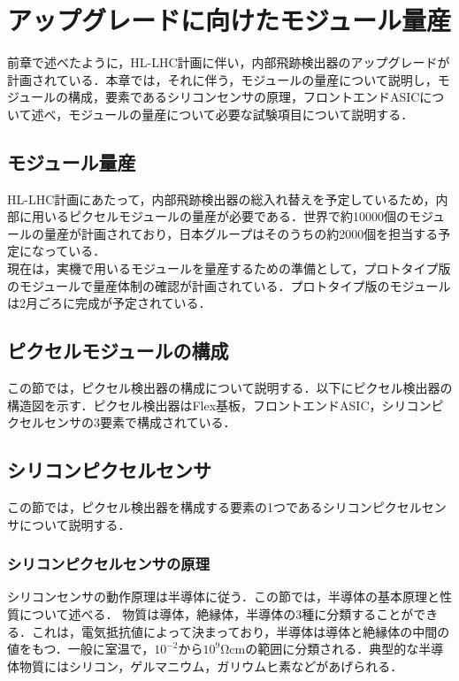 \chapter{アップグレードに向けたモジュール量産}
前章で述べたように，HL-LHC計画に伴い，内部飛跡検出器のアップグレードが計画されている．本章では，それに伴う，モジュールの量産について説明し，モジュールの構成，要素であるシリコンセンサの原理，フロントエンドASICについて述べ，モジュールの量産について必要な試験項目について説明する．

\section{モジュール量産}
HL-LHC計画にあたって，内部飛跡検出器の総入れ替えを予定しているため，内部に用いるピクセルモジュールの量産が必要である．世界で約10000個のモジュールの量産が計画されており，日本グループはそのうちの約2000個を担当する予定になっている．\\
現在は，実機で用いるモジュールを量産するための準備として，プロトタイプ版のモジュールで量産体制の確認が計画されている．プロトタイプ版のモジュールは2月ごろに完成が予定されている．

\section{ピクセルモジュールの構成}
この節では，ピクセル検出器の構成について説明する．以下にピクセル検出器の構造図を示す．ピクセル検出器はFlex基板，フロントエンドASIC，シリコンピクセルセンサの3要素で構成されている．


\section{シリコンピクセルセンサ}
この節では，ピクセル検出器を構成する要素の1つであるシリコンピクセルセンサについて説明する．

\subsection{シリコンピクセルセンサの原理}
シリコンセンサの動作原理は半導体に従う．この節では，半導体の基本原理と性質について述べる．
物質は導体，絶縁体，半導体の3種に分類することができる．これは，電気抵抗値によって決まっており，半導体は導体と絶縁体の中間の値をもつ．一般に室温で，$10^{-2}$から$10^9 \mathrm{\Omega cm}$の範囲に分類される．典型的な半導体物質にはシリコン，ゲルマニウム，ガリウムヒ素などがあげられる．

